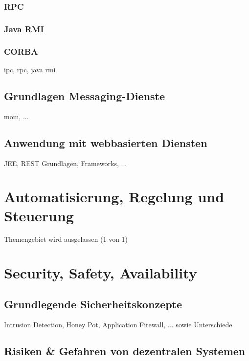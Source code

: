 \documentclass[letterpaper, 12pt]{article}
\let\tempsection\section
\renewcommand\section[1]{\vspace{-0.3cm}\tempsection{#1}\vspace{-0.3cm}}
\let\tempsubsection\subsection
\renewcommand\subsection[1]{\vspace{0cm}\tempsubsection{#1}\vspace{0cm}}
\let\tempsubsubsection\subsubsection
\renewcommand\subsubsection[1]{\vspace{0cm}\tempsubsubsection{#1}\vspace{0cm}}
\begin{document}
\subsubsection{RPC}

\subsubsection{Java RMI}

\subsubsection{CORBA}

ipc, rpc, java rmi

\subsection{Grundlagen Messaging-Dienste}

mom, ...

\subsection{Anwendung mit webbasierten Diensten}

JEE, REST Grundlagen, Frameworks, ...

\clearpage

\section{Automatisierung, Regelung und Steuerung}

Themengebiet wird ausgelassen (1 von 1)

\clearpage

\section{Security, Safety, Availability}

\subsection{Grundlegende Sicherheitskonzepte}

Intrusion Detection, Honey Pot, Application Firewall, ... sowie Unterschiede

\subsection{Risiken \& Gefahren von dezentralen Systemen}
\end{document}

